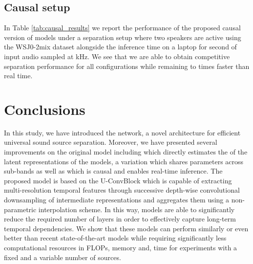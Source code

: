 \subsection{Causal setup}
\label{sec:results:causal_setup}
In Table \ref{tab:causal_results} we report the performance of the proposed causal version of \sudo models under a separation setup where two speakers are active using the WSJ0-2mix dataset \cite{hershey2016deepclustering} alongside the inference time on a laptop for  second of input audio sampled at kHz. We see that we are able to obtain competitive separation performance for all configurations while remaining   to  times faster than real time. 




\section{Conclusions}
\label{sec:conclusions}
In this study, we have introduced the \sudo network, a novel architecture for efficient universal sound source separation. Moreover, we have presented several improvements on the original model including \sudoi which directly estimates the of the latent representations of the models, a variation which shares parameters across sub-bands as well as \csudoi which is causal and enables real-time inference. The proposed model is based on the U-ConvBlock which is capable of extracting multi-resolution temporal features through successive depth-wise convolutional downsampling of intermediate representations and aggregates them using a non-parametric interpolation scheme. In this way, \sudo models are able to significantly reduce the required number of layers in order to effectively capture long-term temporal dependencies. We show that these models can perform similarly or even better than recent state-of-the-art models while requiring significantly less computational resources in FLOPs, memory and, time for experiments with a fixed and a variable number of sources.

      


